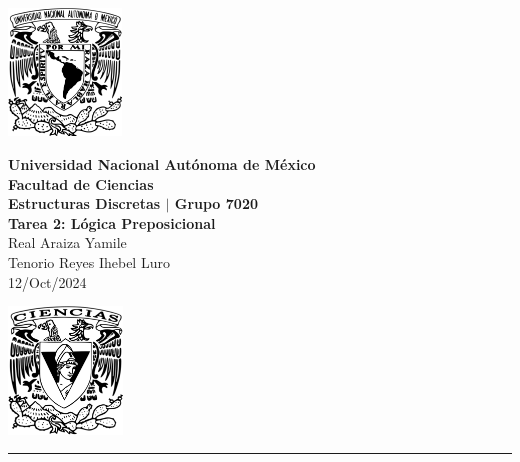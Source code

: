 \documentclass[11pt,letterpaper]{article}
\begin{document}

\begin{center}
    \begin{minipage}{3cm}
    	\begin{center}
    		\includegraphics[height=3.4cm]{./imagenes/logo_unam.png}
    	\end{center}
    \end{minipage}\hfill
    \begin{minipage}{10cm}
    	\begin{center}
    	\textbf{\large Universidad Nacional Autónoma de México}\\[0.1cm]
        \textbf{Facultad de Ciencias}\\[0.1cm]
        \textbf{Estructuras Discretas $|$ Grupo 7020}\\[0.1cm]
        \textbf{Tarea 2: Lógica Preposicional}\\[0.1cm]
        Real Araiza Yamile\\[0.1cm]
        Tenorio Reyes Ihebel Luro\\[0.1cm]
        12/Oct/2024
    	\end{center}
    \end{minipage}\hfill
    \begin{minipage}{3cm}
    	\begin{center}
    		\includegraphics[height=3.4cm]{./imagenes/Logo_FC.png}
    	\end{center}
    \end{minipage}
\end{center}

\rule{17cm}{0.1mm}




\end{document}
